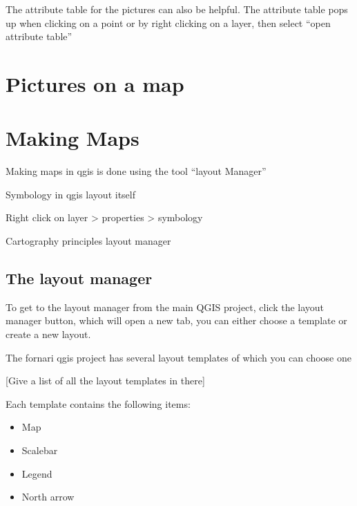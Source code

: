 \documentclass[letterpaper,10pt,english]{sphinxmanual}
\begin{document}
\sphinxAtStartPar
The attribute table for the pictures can also be helpful. The attribute table pops up when clicking on a point or by right clicking on a layer, then select “open attribute table”


\chapter{Pictures on a map}
\label{\detokenize{05_pictures:pictures-on-a-map}}\label{\detokenize{05_pictures::doc}}

\chapter{Making Maps}
\label{\detokenize{06_cartography:making-maps}}\label{\detokenize{06_cartography::doc}}
\sphinxAtStartPar
Making maps in qgis is done using the tool “layout Manager”

\sphinxAtStartPar
Symbology in qgis lay\sphinxhyphen{}out itself

\sphinxAtStartPar
Right click on layer \sphinxhyphen{}\textgreater{} properties \sphinxhyphen{}\textgreater{} symbology

\sphinxAtStartPar
Cartography principles
layout manager


\section{The layout manager}
\label{\detokenize{06_cartography:the-layout-manager}}
\sphinxAtStartPar
To get to the layout manager from the main QGIS project, click the layout manager button, which will open a new tab, you can either choose a template or create a new layout.



\sphinxAtStartPar
The fornari qgis project has several layout templates of which you can choose one

\sphinxAtStartPar
{[}Give a list of all the layout templates in there{]}

\sphinxAtStartPar
Each template contains the following items:
\begin{itemize}
\item {} 
\sphinxAtStartPar
Map

\item {} 
\sphinxAtStartPar
Scalebar

\item {} 
\sphinxAtStartPar
Legend

\item {} 
\sphinxAtStartPar
North arrow

\end{itemize}
\end{document}

